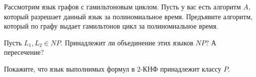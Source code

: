 \begin{task}
   	Рассмотрим язык графов с гамильтоновым циклом. Пусть у вас есть алгоритм $A$, который разрешает данный язык за
    полиномиальное время. Предъявите алгоритм, который по графу выдает гамильтонов цикл за полиномиальное время.
\end{task}

\begin{task}
    Пусть $L_1, L_2 \in NP$. Принадлежит ли объединение этих языков $NP$? А пересечение?
\end{task}

\begin{task}
    Покажите, что язык выполнимых формул в 2-КНФ принадлежит классу $P$.
\end{task}